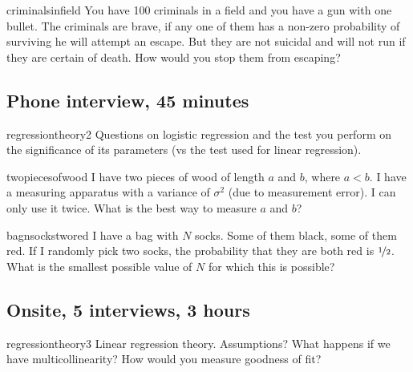 \documentclass[a4paper]{article}
\begin{document}
\begin{question}{criminalsinfield}
You have 100 criminals in a field and you have a gun with one bullet.
The criminals are brave, if any one of them has a non-zero probability of surviving he will attempt an escape.
But they are not suicidal and will not run if they are certain of death.
How would you stop them from escaping?
\end{question}

\clearpage





\clearpage
\subsection{Phone interview, 45 minutes}
\begin{question}{regressiontheory2}
Questions on logistic regression and the test you perform on the significance of its parameters (vs the test used for linear regression).
\end{question}


\begin{question}{twopiecesofwood}
I have two pieces of wood of length $a$ and $b$, where $a<b$.
I have a measuring apparatus with a variance of $\sigma^2$ (due to measurement error).
I can only use it twice.
What is the best way to measure $a$ and $b$?
\end{question}



\begin{question}{bagnsockstwored}
I have a bag with $N$ socks.
Some of them black, some of them red.
If I randomly pick two socks,
the probability that they are both red is $\nicefrac{1}{2}$.
What is the smallest possible value of $N$ for which this is possible?
\end{question}

\clearpage





\clearpage
\subsection{Onsite, 5 interviews, 3 hours}
\begin{question}{regressiontheory3}
Linear regression theory.
Assumptions?
What happens if we have multicollinearity?
How would you measure goodness of fit?
\end{question}
\end{document}
